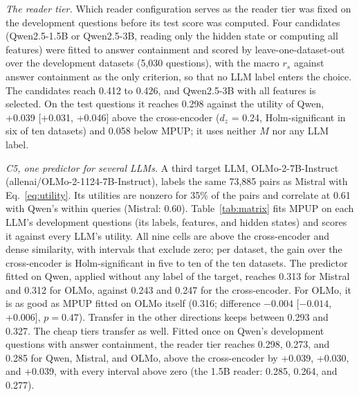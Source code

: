 \documentclass[preprint,12pt,authoryear]{elsarticle}
\begin{document}
\textit{The reader tier.} Which reader configuration serves as the reader tier was fixed on the development questions before its test score was computed. Four candidates (Qwen2.5-1.5B or Qwen2.5-3B, reading only the hidden state or computing all features) were fitted to answer containment and scored by leave-one-dataset-out over the development datasets (5,030 questions), with the macro $r_s$ against answer containment as the only criterion, so that no LLM label enters the choice. The candidates reach 0.412 to 0.426, and Qwen2.5-3B with all features is selected. On the test questions it reaches 0.298 against the utility of Qwen, +0.039 [+0.031, +0.046] above the cross-encoder ($d_z$ = 0.24, Holm-significant in six of ten datasets) and 0.058 below MPUP; it uses neither $M$ nor any LLM label.

\textit{C5, one predictor for several LLMs.} A third target LLM, OLMo-2-7B-Instruct (allenai/OLMo-2-1124-7B-Instruct), labels the same 73,885 pairs as Mistral with Eq.~\eqref{eq:utility}. Its utilities are nonzero for 35\% of the pairs and correlate at 0.61 with Qwen's within queries (Mistral: 0.60). Table~\ref{tab:matrix} fits MPUP on each LLM's development questions (its labels, features, and hidden states) and scores it against every LLM's utility. All nine cells are above the cross-encoder and dense similarity, with intervals that exclude zero; per dataset, the gain over the cross-encoder is Holm-significant in five to ten of the ten datasets. The predictor fitted on Qwen, applied without any label of the target, reaches 0.313 for Mistral and 0.312 for OLMo, against 0.243 and 0.247 for the cross-encoder. For OLMo, it is as good as MPUP fitted on OLMo itself (0.316; difference $-0.004$ [$-0.014$, +0.006], $p = 0.47$). Transfer in the other directions keeps between 0.293 and 0.327. The cheap tiers transfer as well. Fitted once on Qwen's development questions with answer containment, the reader tier reaches 0.298, 0.273, and 0.285 for Qwen, Mistral, and OLMo, above the cross-encoder by +0.039, +0.030, and +0.039, with every interval above zero (the 1.5B reader: 0.285, 0.264, and 0.277).
\end{document}
